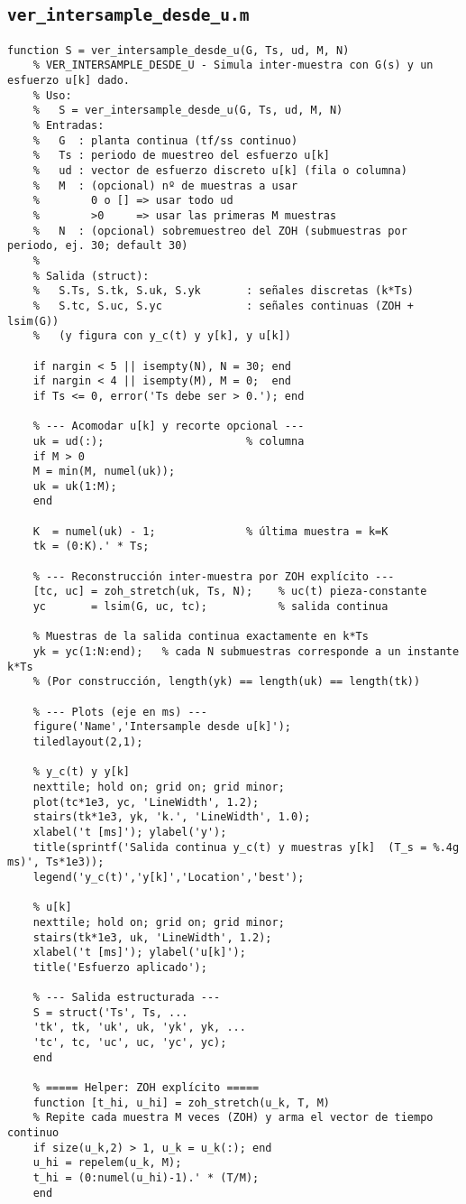 \subsection{\texttt{ver\_intersample\_desde\_u.m}}
\begin{lstlisting}[style=matlabstyle,caption={Reconstrucción inter-muestra desde $u[k]$.}]
	function S = ver_intersample_desde_u(G, Ts, ud, M, N)
	% VER_INTERSAMPLE_DESDE_U - Simula inter-muestra con G(s) y un esfuerzo u[k] dado.
	% Uso:
	%   S = ver_intersample_desde_u(G, Ts, ud, M, N)
	% Entradas:
	%   G  : planta continua (tf/ss continuo)
	%   Ts : periodo de muestreo del esfuerzo u[k]
	%   ud : vector de esfuerzo discreto u[k] (fila o columna)
	%   M  : (opcional) nº de muestras a usar
	%        0 o [] => usar todo ud
	%        >0     => usar las primeras M muestras
	%   N  : (opcional) sobremuestreo del ZOH (submuestras por periodo, ej. 30; default 30)
	%
	% Salida (struct):
	%   S.Ts, S.tk, S.uk, S.yk       : señales discretas (k*Ts)
	%   S.tc, S.uc, S.yc             : señales continuas (ZOH + lsim(G))
	%   (y figura con y_c(t) y y[k], y u[k])
	
	if nargin < 5 || isempty(N), N = 30; end
	if nargin < 4 || isempty(M), M = 0;  end
	if Ts <= 0, error('Ts debe ser > 0.'); end
	
	% --- Acomodar u[k] y recorte opcional ---
	uk = ud(:);                      % columna
	if M > 0
	M = min(M, numel(uk));
	uk = uk(1:M);
	end
	
	K  = numel(uk) - 1;              % última muestra = k=K
	tk = (0:K).' * Ts;
	
	% --- Reconstrucción inter-muestra por ZOH explícito ---
	[tc, uc] = zoh_stretch(uk, Ts, N);    % uc(t) pieza-constante
	yc       = lsim(G, uc, tc);           % salida continua
	
	% Muestras de la salida continua exactamente en k*Ts
	yk = yc(1:N:end);   % cada N submuestras corresponde a un instante k*Ts
	% (Por construcción, length(yk) == length(uk) == length(tk))
	
	% --- Plots (eje en ms) ---
	figure('Name','Intersample desde u[k]');
	tiledlayout(2,1);
	
	% y_c(t) y y[k]
	nexttile; hold on; grid on; grid minor;
	plot(tc*1e3, yc, 'LineWidth', 1.2);
	stairs(tk*1e3, yk, 'k.', 'LineWidth', 1.0);
	xlabel('t [ms]'); ylabel('y');
	title(sprintf('Salida continua y_c(t) y muestras y[k]  (T_s = %.4g ms)', Ts*1e3));
	legend('y_c(t)','y[k]','Location','best');
	
	% u[k]
	nexttile; hold on; grid on; grid minor;
	stairs(tk*1e3, uk, 'LineWidth', 1.2);
	xlabel('t [ms]'); ylabel('u[k]');
	title('Esfuerzo aplicado');
	
	% --- Salida estructurada ---
	S = struct('Ts', Ts, ...
	'tk', tk, 'uk', uk, 'yk', yk, ...
	'tc', tc, 'uc', uc, 'yc', yc);
	end
	
	% ===== Helper: ZOH explícito =====
	function [t_hi, u_hi] = zoh_stretch(u_k, T, M)
	% Repite cada muestra M veces (ZOH) y arma el vector de tiempo continuo
	if size(u_k,2) > 1, u_k = u_k(:); end
	u_hi = repelem(u_k, M);
	t_hi = (0:numel(u_hi)-1).' * (T/M);
	end
\end{lstlisting}
